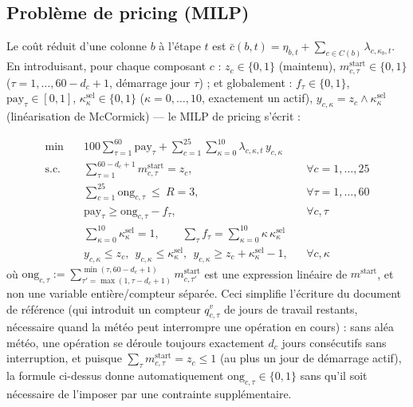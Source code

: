 \documentclass[11pt]{article}
\begin{document}
\subsection{Problème de pricing (MILP)}

Le coût réduit d'une colonne $b$ à l'étape $t$ est $\bar c(b,t) = \eta_{b,t} + \sum_{c\in C(b)}
\lambda_{c,\kappa_b,t}$. En introduisant, pour chaque composant $c$ : $z_c\in\{0,1\}$ (maintenu),
$m^{\text{start}}_{c,\tau}\in\{0,1\}$ ($\tau=1,\dots,60-d_c+1$, démarrage jour $\tau$) ; et globalement :
$f_\tau\in\{0,1\}$, $\mathrm{pay}_\tau\in[0,1]$, $\kappa^{\text{sel}}_\kappa\in\{0,1\}$ ($\kappa=0,\dots,10$,
exactement un actif), $y_{c,\kappa} = z_c \wedge \kappa^{\text{sel}}_\kappa$ (linéarisation de McCormick)
--- le MILP de pricing s'écrit :

\begin{align}
\min\quad & 100\sum_{\tau=1}^{60}\mathrm{pay}_\tau + \sum_{c=1}^{25}\sum_{\kappa=0}^{10}
\lambda_{c,\kappa,t}\, y_{c,\kappa} \label{eq:pricing-obj}\\
\text{s.c.}\quad
 & \textstyle\sum_{\tau=1}^{60-d_c+1} m^{\text{start}}_{c,\tau} = z_c, && \forall c=1,\dots,25
 \label{eq:pricing-c1}\\
 & \textstyle\sum_{c=1}^{25} \mathrm{ong}_{c,\tau} \ \le\ R=3, && \forall \tau=1,\dots,60
 \label{eq:pricing-c4}\\
 & \mathrm{pay}_\tau \ge \mathrm{ong}_{c,\tau} - f_\tau, && \forall c,\tau \label{eq:pricing-c5}\\
 & \textstyle\sum_{\kappa=0}^{10} \kappa^{\text{sel}}_\kappa = 1, \qquad \textstyle\sum_\tau f_\tau =
 \textstyle\sum_{\kappa=0}^{10} \kappa\,\kappa^{\text{sel}}_\kappa \label{eq:pricing-c6}\\
 & y_{c,\kappa} \le z_c,\ \ y_{c,\kappa}\le\kappa^{\text{sel}}_\kappa,\ \ y_{c,\kappa}\ge z_c+
 \kappa^{\text{sel}}_\kappa - 1, && \forall c,\kappa \label{eq:pricing-c7}
\end{align}
où $\displaystyle \mathrm{ong}_{c,\tau} := \!\!\sum_{\tau'=\max(1,\tau-d_c+1)}^{\min(\tau,60-d_c+1)}\!\!
m^{\text{start}}_{c,\tau'}$ est une expression linéaire de $m^{\text{start}}$, et non une variable
entière/compteur séparée. Ceci simplifie l'écriture du document de référence (qui introduit un compteur
$q^v_{c,\tau}$ de jours de travail restants, nécessaire quand la météo peut interrompre une opération en
cours) : sans aléa météo, une opération se déroule toujours exactement $d_c$ jours consécutifs sans
interruption, et puisque $\sum_\tau m^{\text{start}}_{c,\tau}=z_c\le1$ (au plus un jour de démarrage actif),
la formule ci-dessus donne automatiquement $\mathrm{ong}_{c,\tau}\in\{0,1\}$ sans qu'il soit nécessaire de
l'imposer par une contrainte supplémentaire.
\end{document}
